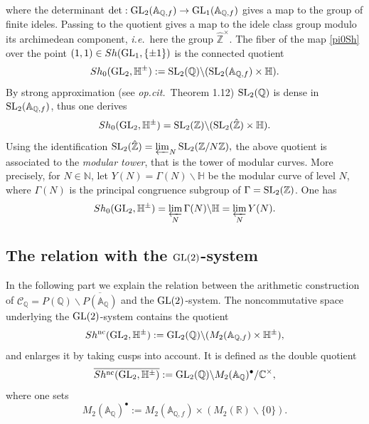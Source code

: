 \documentclass[graybox, envcountsect%
]{svmult}
\def\GL{{\rm GL}}
\def\SL{{\rm SL}}
\def\A{{\mathbb A}}
\def\C{{\mathbb C}}
\def\N{{\mathbb N}}
\def\Q{{\mathbb Q}}
\def\R{{\mathbb R}}
\def\Z{{\mathbb Z}}
\def\H{{\mathbb H}}
\def\hatz{{\hat\Z^\times}}
\def\cC{{\mathcal C}}
\def\caq{{\cC_\Q}}
\newcommand{\ie}{{\it i.e.\/}\ }
\newcommand{\opcit}{{\it op.cit.\/}\ }
\begin{document}
where the determinant $\det: \GL_2(\A_{\Q,f})\to \GL_1(\A_{\Q,f})$ gives a map to  the group of finite ideles. Passing to the quotient  gives a map to the idele class group modulo its archimedean component, \ie here the group $\hatz$. The fiber of the map  \eqref{pi0Sh} over the point $(1,1)\in Sh(\GL_1,\{\pm 1\})$ is the connected quotient 
\begin{equation}\label{ShGL2Hpm0}
Sh_0(\GL_2,\H^\pm):=\SL_2(\Q)\backslash (\SL_2(\A_{\Q,f})\times
\H).
\end{equation}
By strong approximation (see \opcit Theorem 1.12) $\SL_2(\Q)$ is dense in $\SL_2(\A_{\Q,f})$,  thus one derives 
\begin{equation}\label{ShGL2Hpm0bis}
Sh_0(\GL_2,\H^\pm)=\SL_2(\Z)\backslash (\SL_2(\hat\Z)\times
\H).
\end{equation}
Using the identification
$
\SL_2(\hat\Z) =
\varprojlim_N \SL_2(\Z/N\Z),
$
the above quotient is associated to the {\em modular tower}, that is the tower of modular curves. More 
precisely, for $N \in \N$, let $Y(N)=\Gamma(N)\backslash \H$ be the
 modular curve of level $N$, where $\Gamma(N)$
is the principal congruence subgroup of $\Gamma=\SL_2(\Z)$. One has
\begin{equation}\label{ShGL2Hpm0ter}
Sh_0(\GL_2,\H^\pm)=\varprojlim_N \Gamma(N)\backslash 
\H=\varprojlim_N Y(N).
\end{equation}
 

\subsection{The relation with the $\GL(2)$-system}\label{subsec:6.2}

In the following part we explain the relation between the arithmetic construction of  $\caq=P(\Q)\backslash
\overline{P(\A_\Q)}$ and the $\GL(2)$-system.    The noncommutative  space underlying the $\GL(2)$-system contains the
quotient
\begin{equation}\label{ShGL2HpmNC}
Sh^{\rm nc}(\GL_2,\H^\pm):= \GL_2(\Q)\backslash
(M_2(\A_{\Q,f})\times \H^\pm),
\end{equation}
 and enlarges it by taking cusps into account. It is defined as the double quotient
\begin{equation}\label{ncShGL2comp}
\overline{Sh^{\rm nc}(\GL_2,\H^\pm)}:= \GL_2(\Q)\backslash
M_2(\A_\Q)^\bullet /\C^\times,
\end{equation}
where one sets
$$ M_2(\A_\Q)^\bullet:= M_2(\A_{\Q,f})\times (M_2(\R)\smallsetminus
\{0 \}). $$
\end{document}
